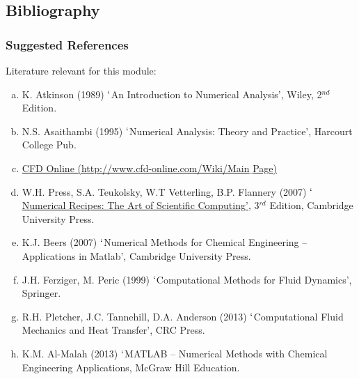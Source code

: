 \documentclass[10pt,compress]{beamer}
\begin{document}
\subsection{Bibliography} 
\begin{frame}
 \frametitle{Suggested References}
  Literature relevant for this module:
  \begin{enumerate}[(a)]
   \item K. Atkinson (1989) $\lq$An Introduction to Numerical Analysis', Wiley, 2$^{nd}$ Edition.
   \item N.S. Asaithambi (1995) $\lq$Numerical Analysis: Theory and Practice', Harcourt College Pub.
   \item \href{http://www.cfd-online.com/Wiki/Main_Page}{CFD Online (http://www.cfd-online.com/Wiki/Main$\_$Page)}
   \item W.H. Press, S.A. Teukolsky, W.T Vetterling, B.P. Flannery (2007) \href{http://www.nr.com/oldverswitcher.html}{$\lq$Numerical Recipes: The Art of Scientific Computing'}, 3$^{rd}$ Edition, Cambridge University Press.
   \item K.J. Beers (2007) $\lq$Numerical Methods for Chemical Engineering -- Applications in Matlab', Cambridge University Press.
   \item J.H. Ferziger, M. Peric (1999) $\lq$Computational Methods for Fluid Dynamics', Springer.
   \item R.H. Pletcher, J.C. Tannehill, D.A. Anderson (2013) $\lq$Computational Fluid Mechanics and Heat Transfer', CRC Press.
   \item K.M. Al-Malah (2013) $\lq$MATLAB -- Numerical Methods with Chemical Engineering Applications, McGraw Hill Education.
  \end{enumerate}
\end{frame}
\end{document}
